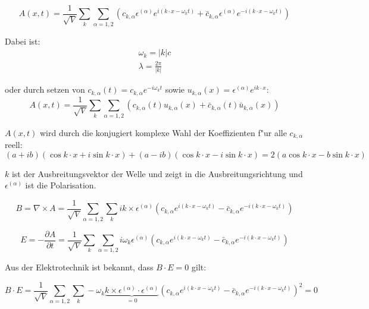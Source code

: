 \begin{equation} \label{fq:wave_eq}
A(x,t) = \frac{1}{\sqrt{V}} \sum_k \sum_{\alpha=1,2} (c_{k,\alpha} \epsilon^{(\alpha)} e^{i (k \cdot x - \omega_k t)} + \bar{c}_{k,\alpha} \epsilon^{(\alpha)} e^{-i(k \cdot x - \omega_k t)})
\end{equation}

Dabei ist:
\begin{align}
\omega_k=|k|c \\
\lambda = \frac{2 \pi}{|k|}
\end{align}

oder durch setzen von $c_{k,\alpha}(t) = c_{k,\alpha} e^{-i \omega_k t}$ sowie $u_{k,\alpha}(x) = \epsilon^{(\alpha)} e^{ik \cdot x}$:
\begin{equation}
A(x,t) = \frac{1}{\sqrt{V}} \sum_k \sum_{\alpha=1,2} (c_{k,\alpha}(t)u_{k,\alpha}(x) + \bar{c}_{k,\alpha}(t) \bar{u}_{k,\alpha}(x))
\end{equation}

$A(x,t)$ wird durch die konjugiert komplexe Wahl der Koeffizienten f"ur alle $c_{k,\alpha}$ reell:
\begin{equation}
(a + ib)(\cos k \cdot x + i \sin k \cdot x ) + (a - ib)(\cos k \cdot x - i \sin k \cdot x ) = 2 ( a \cos k \cdot x - b \sin k \cdot x )
\end{equation}

$k$ ist der Ausbreitungsvektor der Welle und zeigt in die Ausbreitungsrichtung und $\epsilon^{(\alpha)}$ ist die Polarisation. 

\begin{equation}
B = \nabla \times A = \frac{1}{ \sqrt{V}} \sum_{\alpha=1,2}  \sum_k ik \times \epsilon^{(\alpha)} (c_{k,\alpha} e^{i (k \cdot x - \omega_k t)} - \bar{c}_{k,\alpha} e^{-i(k \cdot x - \omega_k t)})
\end{equation}

\begin{equation}
E = - \frac{\partial A}{\partial t} = \frac{1}{\sqrt{V}} \sum_k \sum_{\alpha=1,2} i \omega_k \epsilon^{(\alpha)} (c_{k,\alpha} e^{i (k \cdot x - \omega_k t)} - \bar{c}_{k,\alpha} e^{-i(k \cdot x - \omega_k t)})
\end{equation}

Aus der Elektrotechnik ist bekannt, dass $B \cdot E = 0$ gilt:

\begin{equation}
B \cdot E = \frac{1}{\sqrt{V}} \sum_{\alpha=1,2}   \sum_k -\omega_k \underbrace{k \times  \epsilon^{(\alpha)} \cdot \epsilon^{(\alpha)}}_{=0} (c_{k,\alpha} e^{i (k \cdot x - \omega_k t)} - \bar{c}_{k,\alpha} e^{-i(k \cdot x - \omega_k t)})^2 = 0
\end{equation}

